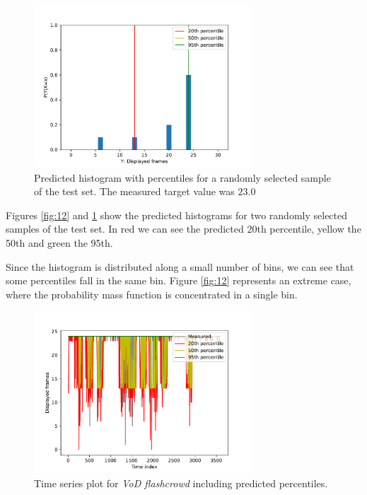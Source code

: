 \documentclass[10pt]{article}
\begin{document}
\begin{figure}[h!]
    \centering
    \captionsetup{justification=centering}
    \includegraphics[width=0.72\textwidth,height=\textheight,keepaspectratio]{../result/project1/P(Y|X=x)_8597_percentiles.pdf}
    \caption{Predicted histogram with percentiles for a randomly selected sample of the test set. The measured target value was $23.0$}
    \label{fig:13}
\end{figure}

Figures \ref{fig:12} and \ref{fig:13} show the predicted histograms for two randomly selected samples of the test set. In red we can see the predicted 20th percentile, yellow the 50th and green the 95th.

Since the histogram is distributed along a small number of bins, we can see that some percentiles fall in the same bin. Figure \ref{fig:12} represents an extreme case, where the probability mass function is concentrated in a single bin.

\begin{figure}[h!]
    \centering
    \includegraphics[width=0.72\textwidth,height=\textheight,keepaspectratio]{../result/project1/percentiles_timeplot.pdf}
    \caption{Time series plot for \textit{VoD flashcrowd} including predicted percentiles.}
    \label{fig:14}
\end{figure}
\end{document}
